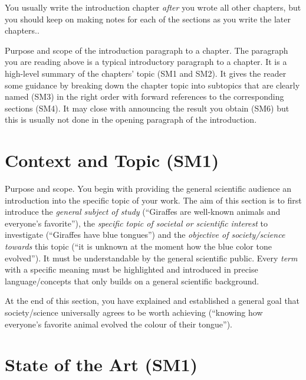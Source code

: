 \documentclass[12pt,a4paper,footinclude=true,twoside,headinclude=true]{report}
\begin{document}
You usually write the introduction chapter \emph{after} you wrote all other chapters, but you should keep on making notes for each of the sections as you write the later chapters..

\textsf{Purpose and scope of the introduction paragraph to a chapter}. The paragraph you are reading above is a typical introductory paragraph to a chapter. It is a high-level summary of the chapters' topic (SM1 and SM2). It gives the reader some guidance by breaking down the chapter topic into subtopics that are clearly named (SM3) in the right order with forward references to the corresponding sections (SM4). It may close with announcing the result you obtain (SM6) but this is usually not done in the opening paragraph of the introduction.

\section{Context and Topic (SM1)}\label{sec:introduction:topic}

\textsf{Purpose and scope}. You begin with providing the general scientific audience an introduction into the specific topic of your work. The aim of this section is to first introduce the \emph{general subject of study} (``Giraffes are well-known animals and everyone's favorite''), the \emph{specific topic of societal or scientific interest} to investigate (``Giraffes have blue tongues'') and the \emph{objective of society/science towards} this topic (``it is unknown at the moment how the blue color tone evolved''). 
It must be understandable by the general scientific public. Every \emph{term} with a specific meaning must be highlighted and introduced in precise language/concepts that only builds on a general scientific background. 

At the end of this section, you have explained and established a general goal that society/science universally agrees to be worth achieving (``knowing how everyone's favorite animal evolved the colour of their tongue'').

\section{State of the Art (SM1)}\label{sec:introduction:state-of-art}
\end{document}
